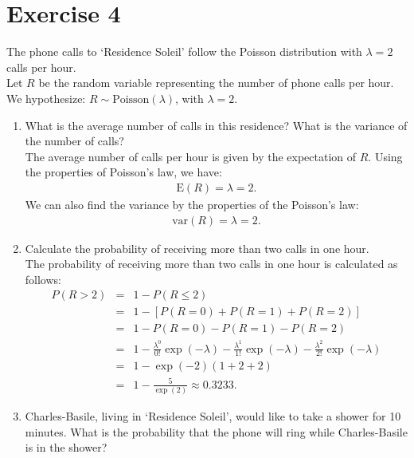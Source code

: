 \documentclass[12pt,thmsa]{article}
\begin{document}
\section*{Exercise 4}

The phone calls to `Residence Soleil' follow the Poisson distribution with $\lambda = 2$ calls per hour.\\

Let $ R $ be the random variable representing the number of phone calls per hour. We hypothesize: $R \sim \text{Poisson}(\lambda)$, with $\lambda=2$.

\begin{enumerate}%
\item What is the average number of calls in this residence? What is the variance of the number of calls?\\

The average number of calls per hour is given by the expectation of $ R $. Using the properties of Poisson's law, we have:\begin{eqnarray*}
  \text{E}(R) = \lambda = 2.
\end{eqnarray*}
We can also find the variance by the properties of the Poisson's law:
\begin{eqnarray*}
\text{var}(R) = \lambda = 2.
\end{eqnarray*}


\item Calculate the probability of receiving more than two calls in one hour.\\

The probability of receiving more than two calls in one hour is calculated as follows:
\begin{eqnarray*}
P(R>2) & = & \left. 1-P(R\leq 2)  \right. \nonumber \\
& = & \left. 1- \left[P(R=0)+P(R=1)+P(R=2)\right] \right. \nonumber \\
& = & \left. 1- P(R=0)-P(R=1)-P(R=2) \right. \nonumber \\
& = & \left. 1- \frac{\lambda^{0}}{0!}\exp(-\lambda)-\frac{\lambda^{1}}{1!}\exp(-\lambda)-\frac{\lambda^{2}}{2!}\exp(-\lambda) \right. \nonumber \\
& = & \left. 1- \exp(-2)(1+2+2) \right. \nonumber \\
& = & \left. 1-\frac{5}{\exp(2)} \approx 0.3233. \right. \nonumber
\end{eqnarray*}


\item Charles-Basile, living in `Residence Soleil', would like to take a shower for 10 minutes.
What is the probability that the phone will ring while Charles-Basile is in the shower?\\


\end{enumerate}
\end{document}
